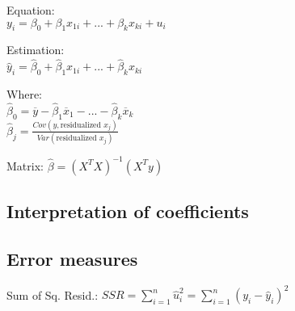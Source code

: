 \documentclass[10pt, a4paper, landscape]{extarticle}
\begin{document}
\begin{multicols}{3}
\begin{multicols}{2}
\columnbreak

Equation: \\ $y_i = \beta_0 + \beta_1 x_{1i} + ... + \beta_k x_{ki} + u_i$

\vspace*{1mm}

Estimation: \\ $\hat{y}_i = \hat{\beta}_0 + \hat{\beta}_1 x_{1i} + ... + \hat{\beta}_k x_{ki}$

\vspace*{1mm}

Where: \\ $\hat{\beta}_0 = \overline{y} - \hat{\beta}_1 \overline{x}_1 - ... - \hat{\beta}_k \overline{x}_k$ \\ $\hat{\beta}_j = \frac{Cov(y, \text{residualized } x_j)}{Var(\text{residualized } x_j)}$

\vspace*{1mm}

Matrix: $\hat{\beta} = (X^T X)^{-1} (X^T y)$

\end{multicols}

\subsection*{Interpretation of coefficients}


\subsection*{Error measures}

Sum of Sq. Resid.: \hfill $SSR = \sum_{i=1}^n \hat{u}_i^2 = \sum_{i=1}^n (y_i - \hat{y}_i)^2$


\end{multicols}
\end{document}
